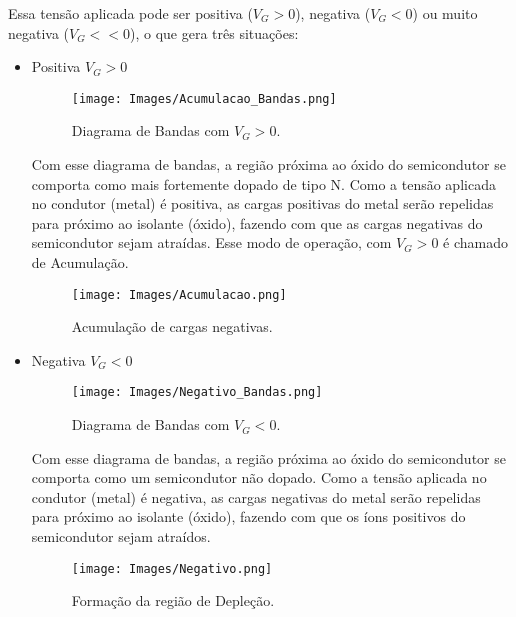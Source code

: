 \documentclass[12pt]{article}
\begin{document}
Essa tensão aplicada pode ser positiva ($V_G>0$), negativa ($V_G<0$) ou muito negativa ($V_G<<0$), o que gera três situações: \\[2cm]

\begin{itemize}
  \item Positiva $V_G > 0$
  
  \begin{figure}[H]
    \begin{center}
      \texttt{[image: Images/Acumulacao\_Bandas.png]}
    \end{center}
    \caption{Diagrama de Bandas com $V_G>0$.}
  \end{figure}

  Com esse diagrama de bandas, a região próxima ao óxido do semicondutor se comporta como mais fortemente dopado de tipo N.
Como a tensão aplicada no condutor (metal) é positiva, as cargas positivas do metal serão repelidas para próximo ao isolante (óxido), fazendo com que as cargas negativas do semicondutor sejam atraídas. Esse modo de operação, com $V_G> 0$ é chamado de Acumulação.

\begin{figure}[H]
  \begin{center}
    \texttt{[image: Images/Acumulacao.png]}
  \end{center}
  \caption{Acumulação de cargas negativas.}
\end{figure}

  \item Negativa $V_G < 0$
  
  \begin{figure}[H]
    \begin{center}
      \texttt{[image: Images/Negativo\_Bandas.png]}
    \end{center}
    \caption{Diagrama de Bandas com $V_G<0$.}
  \end{figure}

  Com esse diagrama de bandas, a região próxima ao óxido do semicondutor se comporta como um semicondutor não dopado.
	Como a tensão aplicada no condutor (metal) é negativa, as cargas negativas do metal serão repelidas para próximo ao isolante (óxido), fazendo com que os íons positivos do semicondutor sejam atraídos. 


  \begin{figure}[H]
    \begin{center}
      \texttt{[image: Images/Negativo.png]}
    \end{center}
    \caption{Formação da região de Depleção.}
  \end{figure}


\end{itemize}
\end{document}

